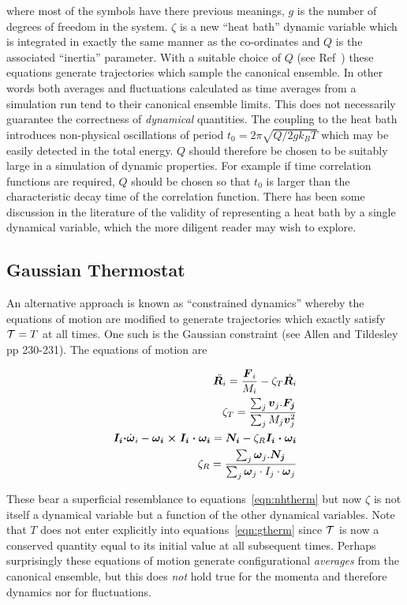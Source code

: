 \documentclass[twoside]{report}
\newcommand{\bm}[1]{\mbox{\boldmath \protect\(#1\protect\)}}
\begin{document}
\noindent
where most of the symbols have there previous meanings, $g$ is the
number of degrees of freedom in the system. $\zeta$ is a new ``heat
bath'' dynamic variable which is integrated in exactly the same manner
as the co-ordinates and $Q$ is the associated ``inertia'' parameter.
With a suitable choice of $Q$ (see Ref~\cite{nose:84}) these equations
generate trajectories which sample the canonical ensemble.  In other
words both averages and fluctuations calculated as time averages from
a simulation run tend to their canonical ensemble limits.  This does
not necessarily guarantee the correctness of {\em dynamical}\/
quantities.  The coupling to the heat bath introduces non-physical
oscillations of period $t_0 = 2 \pi \sqrt{Q / 2 g k_B T}$ which may be
easily detected in the total energy\cite{nose:91}.  $Q$ should
therefore be chosen to be suitably large in a simulation of dynamic
properties\cite{cho:92}. For example if time correlation functions are
required, $Q$ should be chosen so that $t_0$ is larger than the
characteristic decay time of the correlation function.  There has been
some discussion in the literature of the validity of representing a
heat bath by a single dynamical variable, which the more diligent
reader may wish to explore\cite{cho:93,nose:91}.

\subsection{Gaussian Thermostat}
An alternative approach is known as ``constrained dynamics'' whereby
the equations of motion are modified to generate trajectories which
exactly satisfy ${\cal T} = T$ at all times.  One such is the Gaussian
constraint (see Allen and Tildesley\cite{allen:87} pp 230-231). The
equations of motion are 

\begin{eqnarray}
\label{eqn:gtherm}
\itemsep=0.5em
\ddot{\bm{R}_i} = \frac{\bm{F}_i}{M_i} - \zeta_T \dot{\bm{R}_i} \nonumber \\
\zeta_T = \frac{\sum_j\bm{v}_j . \bm{F_j}}{\sum_j M_j\bm{v}_j^2} \\
\bm{I_i \cdot} \dot{\bm{\omega}}_i - \bm{\omega_i \times I_i \cdot
\omega_i} = \bm{N_i} - \zeta_R \bm{I_i \cdot \omega_i} \nonumber \\
\zeta_R = \frac{\sum_j\bm{\omega}_j . \bm{N_j}}{\sum_j \bm{\omega}_j
  \cdot I_j \cdot \bm{\omega}_j}\nonumber 
\end{eqnarray}

These bear a superficial resemblance to equations~\ref{eqn:nhtherm}
but now $\zeta$ is not itself a dynamical variable but a function of the
other dynamical variables.  Note
that $T$ does not enter explicitly into  equations~\ref{eqn:gtherm}
since ${\cal T}$ is now a conserved quantity equal to its initial
value at all subsequent times. Perhaps surprisingly these equations of
motion generate configurational {\em averages}\/ from the canonical
ensemble, but this does {\em not}\/ hold true for the momenta and
therefore dynamics nor for fluctuations. 
\end{document}
